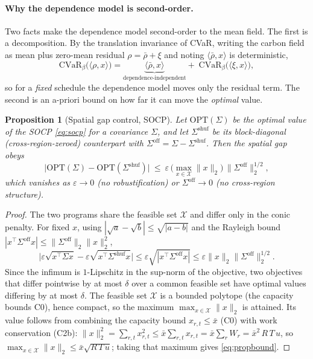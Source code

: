 \documentclass[12pt]{article}
\newtheorem{proposition}{Proposition}
\newcommand{\CVaR}{\mathrm{CVaR}}
\begin{document}
\paragraph{Why the dependence model is second-order.} Two facts make the
dependence model second-order to the mean field. The first is a decomposition. By
the translation invariance of CVaR, writing the carbon field as mean plus zero-mean
residual $\rho=\bar\rho+\xi$ and noting $\langle\bar\rho,x\rangle$ is deterministic,
\begin{equation}
\CVaR_\beta\!\big(\langle\rho,x\rangle\big)=
\underbrace{\langle\bar\rho,x\rangle}_{\text{dependence-independent}}+\;
\CVaR_\beta\!\big(\langle\xi,x\rangle\big),
\label{eq:meandom}
\end{equation}
so for a \emph{fixed} schedule the dependence model moves only the residual term.
The second is an a-priori bound on how far it can move the \emph{optimal} value.

\begin{proposition}[Spatial gap control, SOCP]\label{prop:meandom}
Let $\mathrm{OPT}(\Sigma)$ be the optimal value of the SOCP \eqref{eq:socp} for a
covariance $\Sigma$, and let $\Sigma^{\mathrm{shuf}}$ be its block-diagonal
(cross-region-zeroed) counterpart with $\Sigma^{\mathrm{off}}=\Sigma-
\Sigma^{\mathrm{shuf}}$. Then the spatial gap obeys
\begin{equation}
\big|\mathrm{OPT}(\Sigma)-\mathrm{OPT}(\Sigma^{\mathrm{shuf}})\big|\ \le\
\varepsilon\,\Big(\max_{x\in\mathcal X}\lVert x\rVert_2\Big)\,
\big\lVert\Sigma^{\mathrm{off}}\big\rVert_2^{1/2},
\label{eq:propbound}
\end{equation}
which vanishes as $\varepsilon\to0$ (no robustification) or
$\Sigma^{\mathrm{off}}\to0$ (no cross-region structure).
\end{proposition}

\begin{proof}
The two programs share the feasible set $\mathcal X$ and differ only in the conic
penalty. For fixed $x$, using $|\sqrt a-\sqrt b|\le\sqrt{|a-b|}$ and the Rayleigh
bound $|x^\top\Sigma^{\mathrm{off}}x|\le\lVert\Sigma^{\mathrm{off}}\rVert_2\lVert
x\rVert_2^2$,
\[
\big|\varepsilon\sqrt{x^\top\Sigma x}-\varepsilon\sqrt{x^\top\Sigma^{\mathrm{shuf}}x}\big|
\le\varepsilon\sqrt{|x^\top\Sigma^{\mathrm{off}}x|}
\le\varepsilon\lVert x\rVert_2\lVert\Sigma^{\mathrm{off}}\rVert_2^{1/2}.
\]
Since the infimum is $1$-Lipschitz in the sup-norm of the objective, two objectives
that differ pointwise by at most $\delta$ over a common feasible set have optimal
values differing by at most $\delta$. The feasible set $\mathcal X$ is a bounded
polytope (the capacity bounds C0), hence compact, so the maximum
$\max_{x\in\mathcal X}\lVert x\rVert_2$ is attained. Its value follows from combining
the capacity bound $x_{r,t}\le\bar x$ (C0) with work conservation (C2b):
$\lVert x\rVert_2^2=\sum_{r,t}x_{r,t}^2\le\bar x\sum_{r,t}x_{r,t}=\bar x\sum_r W_r
=\bar x^2\,R\,T\,u$, so $\max_{x\in\mathcal X}\lVert x\rVert_2\le\bar x\sqrt{R\,T\,u}$;
taking that maximum gives \eqref{eq:propbound}.
\end{proof}
\end{document}
